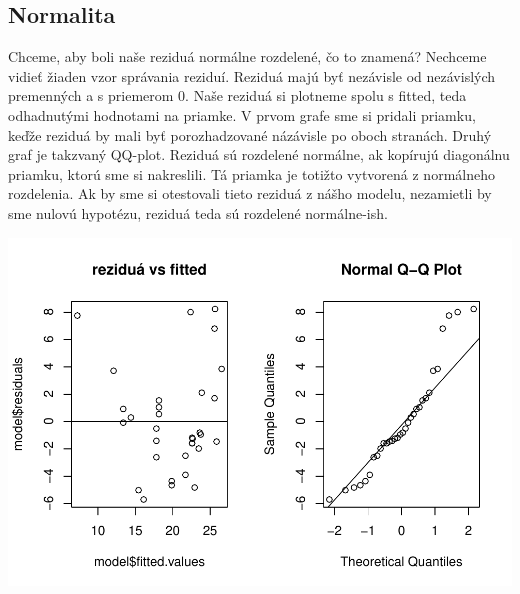 \hypertarget{normalita}{%
\subsection{Normalita}\label{normalita}}

Chceme, aby boli naše reziduá normálne rozdelené, čo to znamená?
Nechceme vidieť žiaden vzor správania reziduí. Reziduá majú byť
nezávisle od nezávislých premenných a s priemerom 0. Naše reziduá si
plotneme spolu s fitted, teda odhadnutými hodnotami na priamke. V prvom
grafe sme si pridali priamku, keďže reziduá by mali byť porozhadzované
názávisle po oboch stranách. Druhý graf je takzvaný QQ-plot. Reziduá sú
rozdelené normálne, ak kopírujú diagonálnu priamku, ktorú sme si
nakreslili. Tá priamka je totižto vytvorená z normálneho rozdelenia. Ak
by sme si otestovali tieto reziduá z nášho modelu, nezamietli by sme
nulovú hypotézu, reziduá teda sú rozdelené normálne-ish.

\begin{Shaded}
\begin{Highlighting}[]

\NormalTok{(}\NormalTok{(}\NormalTok{, }\NormalTok{))}

\OperatorTok{$}\OperatorTok{$} \NormalTok{)}
\NormalTok{(}\NormalTok{, }\NormalTok{)}

\OperatorTok{$}
\OperatorTok{$}
\end{Highlighting}
\end{Shaded}

\includegraphics{test_files/figure-latex/unnamed-chunk-50-1.pdf}


